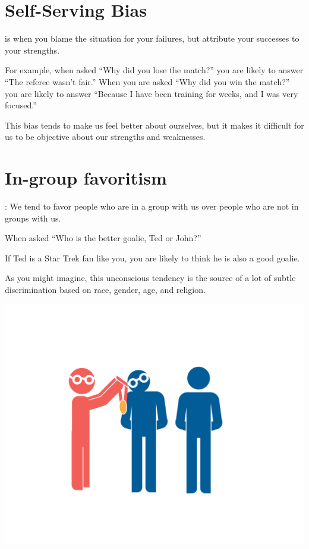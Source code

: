 \section{Self-Serving Bias}

 is when you blame the situation for your
failures, but attribute your successes to your strengths.

For example, when asked ``Why did you lose the match?'' you are likely
to answer ``The referee wasn't fair.''  When you are asked ``Why did
you win the match?'' you are likely to answer ``Because I have been
training for weeks, and I was very focused.''


This bias tends to make us feel better about ourselves, but it makes it
difficult for us to be objective about our strengths and weaknesses.

\section{In-group favoritism}

: We tend to favor people who are in
a group with us over people who are not in groups with us.

When asked ``Who is the better goalie, Ted or John?''

If Ted is a Star Trek fan like you, you are likely to think he is also
a good goalie.

As you might imagine, this unconscious tendency is the source of a lot
of subtle discrimination based on race, gender, age, and religion.

\includegraphics[width=1\textwidth]{inGroupFavoritism.png}

